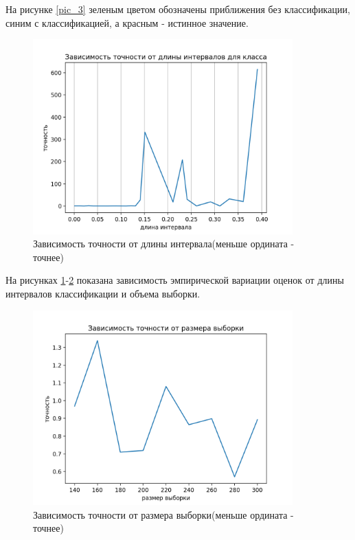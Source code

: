 \documentclass[a4paper,14pt]{extarticle}
\begin{document}
На рисунке \ref{pic_3} зеленым цветом обозначены приближения без классификации, синим с классификацией, а красным - истинное значение.
\newpage
\begin{figure}[ht]
    \centering
    \includegraphics[width=100mm]{pics/plot_90_4_accuracy-length.png}
    \caption{Зависимость точности от длины интервала(меньше ордината - точнее)\label{overflow}}
    \label{pic_4}
\end{figure}
На рисунках \ref{pic_4}-\ref{pic_5} показана зависимость эмпирической вариации оценок от длины интервалов классификации и объема выборки.
\begin{figure}[hb]
    \centering
    \includegraphics[width=100mm]{pics/plot_90_4_accuracy-samplesize.png}
    \caption{Зависимость точности от размера выборки(меньше ордината - точнее)\label{overflow}}
    \label{pic_5}
\end{figure}
\newpage
\end{document}
